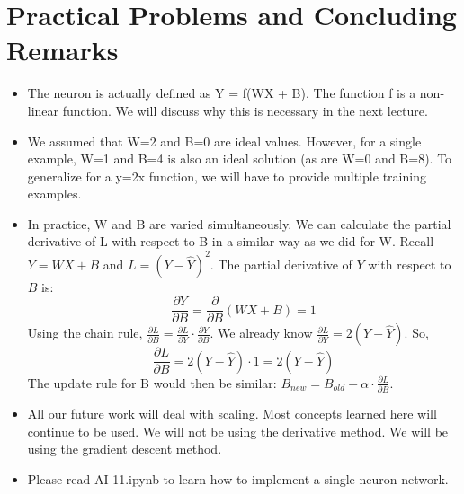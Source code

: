 \documentclass[12pt,a4paper]{article}
\begin{document}
\section{Practical Problems and Concluding Remarks}
\begin{itemize}
    \item The neuron is actually defined as Y = f(WX + B). The function f is a non-linear function. We will discuss why this is necessary in the next lecture. 
    \item We assumed that W=2 and B=0 are ideal values. However, for a single example, W=1 and B=4 is also an ideal solution (as are W=0 and B=8). To generalize for a y=2x function, we will have to provide multiple training examples.
    \item In practice, W and B are varied simultaneously. We can calculate the partial derivative of L with respect to B in a similar way as we did for W.
    Recall $ Y = WX + B $ and $ L = (Y - \hat{Y})^2 $.
    The partial derivative of $ Y $ with respect to $ B $ is:
    \[ \frac{\partial Y}{\partial B} = \frac{\partial}{\partial B}(WX + B) = 1 \]
    Using the chain rule, $ \frac{\partial L}{\partial B} = \frac{\partial L}{\partial Y} \cdot \frac{\partial Y}{\partial B} $. We already know $ \frac{\partial L}{\partial Y} = 2(Y - \hat{Y}) $.
    So,
    \[ \frac{\partial L}{\partial B} = 2(Y - \hat{Y}) \cdot 1 = 2(Y - \hat{Y}) \]
    The update rule for B would then be similar: $ B_{new} = B_{old} - \alpha \cdot \frac{\partial L}{\partial B} $.
    \item All our future work will deal with scaling. Most concepts learned here will continue to be used. We will not be using the derivative method. We will be using the gradient descent method.
    \item Please read AI-11.ipynb to learn how to implement a single neuron network.
\end{itemize}
\end{document}
